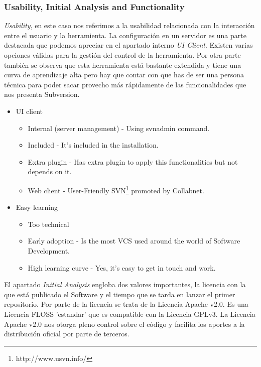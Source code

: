 \documentclass[11pt]{scrartcl}
\begin{document}
\subsubsection{Usability, Initial Analysis and Functionality}

\par \emph{Usability}, en este caso nos referimos a la usabilidad relacionada con la interacci\'on entre el usuario y la herramienta. La configuraci\'on en un servidor es una parte destacada que podemos apreciar en el apartado interno \emph{UI Client}. Existen varias opciones v\'alidas para la gesti\'on del control de la herramienta. Por otra parte tambi\'en se observa que esta herramienta est\'a bastante extendida y tiene una curva de aprendizaje alta pero hay que contar con que has de ser una persona t\'ecnica para poder sacar provecho m\'as r\'apidamente de las funcionalidades que nos presenta Subversion.

\begin{itemize}
    \item UI client
	    \begin{itemize}
            \item Internal (server management) - Using svnadmin command.
            \item Included - It's included in the installation.
            \item Extra plugin - Has extra plugin to apply this functionalities but not depends on it.
            \item Web client - User-Friendly SVN\footnote{http://www.usvn.info/} promoted by Collabnet.
        \end{itemize}

    \item Easy learning
	    \begin{itemize}
            \item Too technical 
            \item Early adoption - Is the most VCS used around the world of Software Development.
            \item High learning curve - Yes, it's easy to get in touch and work.
        \end{itemize}
\end{itemize}

\par El apartado \emph{Initial Analysis} engloba dos valores importantes, la licencia con la que est\'a publicado el Software y el tiempo que se tarda en lanzar el primer repositorio. Por parte de la licencia se trata de la Licencia Apache v2.0. Es una Licencia FLOSS 'estandar' que es compatible con la Licencia GPLv3. La Licencia Apache v2.0 nos otorga pleno control sobre el c\'odigo y facilita los aportes a la distribuci\'on oficial por parte de terceros.
\end{document}
